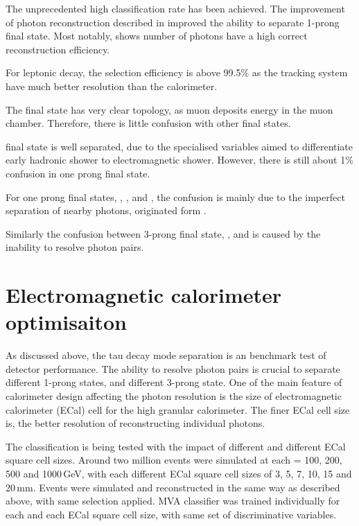 The unprecedented high classification rate has been achieved. The improvement of photon reconstruction described in \Section{} improved the ability to separate 1-prong final state. Most notably,  \Figure{} shows number of photons have a high correct reconstruction efficiency.

For leptonic decay, the selection efficiency is above 99.5\% as the tracking system have much better resolution than the calorimeter.

The \decayMuonShort final state has very clear topology, as muon deposits energy in the muon chamber. Therefore, there is little confusion with other final states.

\decayElectronShort final state is well separated, due to the specialised variables aimed to differentiate early hadronic shower to electromagnetic shower. However, there is still about 1\% confusion in one prong final state.

For one prong final states, \decayPionShort, \decayRhoShortest, and \decayAiPhotonShortest, the confusion is mainly due to the imperfect separation of nearby photons, originated form \Ppizero.


Similarly the confusion between 3-prong final state, \decayAiPionShortest, and \decayThreePionPhotonShort is caused by the inability to resolve photon pairs.

\section{Electromagnetic calorimeter  optimisaiton}

As discussed above, the tau decay mode separation is an benchmark test of detector performance. The ability to resolve photon pairs is crucial to separate different 1-prong states, and different 3-prong state. One of the main feature of calorimeter design affecting the photon resolution is the size of electromagnetic calorimeter (ECal) cell for the high granular calorimeter. The finer ECal cell size is, the better resolution of reconstructing individual photons.


The classification is being tested with the impact of different \sqrtS and different ECal square cell sizes. Around two million events were simulated at each \sqrtS = 100, 200, 500 and 1000\,GeV, with each different ECal square cell sizes of 3, 5, 7, 10, 15 and 20\,mm. Events were simulated and reconstructed in the same way as described above, with same selection applied. MVA classifier was trained individually for each \sqrtS and each ECal square cell size, with same set of discriminative variables.

